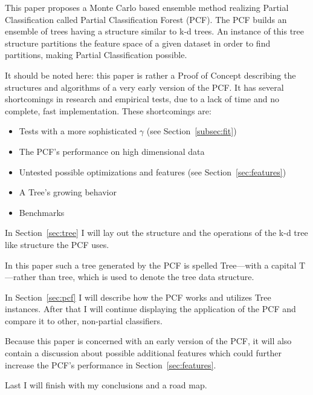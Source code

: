 This paper proposes a Monte Carlo based ensemble method
realizing Partial Classification called Partial
Classification Forest (PCF). The PCF builds an ensemble of
trees having a structure similar to k-d trees. An instance
of this tree structure partitions the feature space of a
given dataset in order to find partitions, making Partial
Classification possible.

It should be noted here: this paper is rather a Proof
of Concept describing the structures and algorithms of a
very early version of the PCF. It has several shortcomings
in research and empirical tests, due to a lack of time and
no complete, fast implementation. These shortcomings are:

\begin{itemize}

\item Tests with a more sophisticated $\gamma$ (see
      Section~\ref{subsec:fit})

\item The PCF's performance on high dimensional data

\item Untested possible optimizations and features (see
      Section~\ref{sec:features})

\item A Tree's growing behavior

\item Benchmarks

\end{itemize}

In Section~\ref{sec:tree} I will lay out
the structure and the operations of the k-d tree like
structure the PCF uses.

In this paper such a tree generated by the PCF is
spelled Tree---with a capital T---rather than tree,
which is used to denote the tree data structure.

In Section~\ref{sec:pcf} I will describe how the PCF works
and utilizes Tree instances. After that I will continue
displaying the application of the PCF and compare it to
other, non-partial classifiers.

Because this paper is concerned with an early version of
the PCF, it will also contain a discussion about possible
additional features which could further increase the PCF's
performance in Section~\ref{sec:features}.

Last I will finish with my conclusions and a road map.
